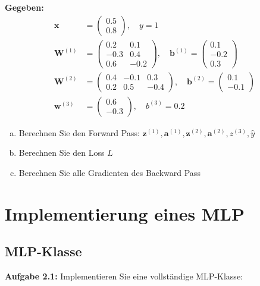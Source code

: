﻿\documentclass[12pt,a4paper]{article}
\begin{document}
\textbf{Gegeben:}
\begin{align}
\mathbf{x} &= \begin{pmatrix} 0.5 \\ 0.8 \end{pmatrix}, \quad y = 1 \\
\mathbf{W}^{(1)} &= \begin{pmatrix} 0.2 & 0.1 \\ -0.3 & 0.4 \\ 0.6 & -0.2 \end{pmatrix}, \quad \mathbf{b}^{(1)} = \begin{pmatrix} 0.1 \\ -0.2 \\ 0.3 \end{pmatrix} \\
\mathbf{W}^{(2)} &= \begin{pmatrix} 0.4 & -0.1 & 0.3 \\ 0.2 & 0.5 & -0.4 \end{pmatrix}, \quad \mathbf{b}^{(2)} = \begin{pmatrix} 0.1 \\ -0.1 \end{pmatrix} \\
\mathbf{w}^{(3)} &= \begin{pmatrix} 0.6 \\ -0.3 \end{pmatrix}, \quad b^{(3)} = 0.2
\end{align}

\begin{enumerate}[(a)]
    \item Berechnen Sie den Forward Pass: $\mathbf{z}^{(1)}, \mathbf{a}^{(1)}, \mathbf{z}^{(2)}, \mathbf{a}^{(2)}, z^{(3)}, \hat{y}$ 
    \item Berechnen Sie den Loss $L$ 
    \item Berechnen Sie alle Gradienten des Backward Pass 
\end{enumerate}

\section{Implementierung eines MLP }

\subsection{MLP-Klasse }

\textbf{Aufgabe 2.1:} Implementieren Sie eine vollständige MLP-Klasse:
\end{document}
